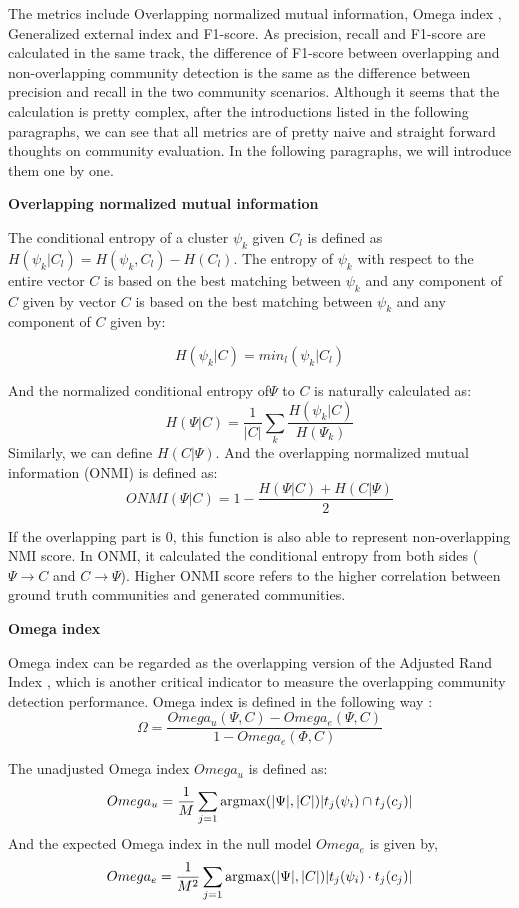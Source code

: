 The metrics include Overlapping normalized mutual information, Omega index ,  Generalized external index and F1-score. As precision, recall and F1-score  are calculated in the same track, the difference of F1-score between overlapping and non-overlapping community detection is the same as the difference between precision and recall in the two community scenarios. Although it seems that the calculation is pretty complex, after the introductions listed in the following paragraphs, we can see that all metrics are of pretty naive and straight forward thoughts on community evaluation. In the following paragraphs, we will introduce them one by one.

\textbf{Overlapping normalized   mutual information}

The conditional entropy of a cluster $\psi_{k}$ given $C_{l}$ is
defined as $H(\psi_{k}|C_{l}) = H(\psi_{k},C_{l}) - H(C_{l})$. The entropy of $\psi_{k}$ with respect to the entire vector $C$ is based on the best matching between $\psi_{k}$ and any component of $C$ given by
vector $C$ is based on the best matching between $\psi_{k}$ and any component of $C$ given by:

$$
H(\psi_{k}|C) = min_l (\psi_{k}|C_{l})
$$

And the normalized conditional entropy of$\Psi$ to $C$ is naturally calculated as:
$$
H(\Psi|C) = \frac{1}{|C|}\sum_{k} \frac{H(\psi_{k}|C)}{H(\Psi_{k}) }
$$
Similarly, we can define $H(C|\Psi)$. And the overlapping normalized mutual information (ONMI) \cite{mcdaid2011normalized} is defined as: 
$$ONMI(\Psi|C) = 1 - \frac{H(\Psi|C)+H(C|\Psi)}{2}$$

If the overlapping part is 0, this function is also able to represent non-overlapping NMI score. In ONMI, it calculated the conditional entropy from both sides ($\Psi \rightarrow	 C$ and $C \rightarrow	\Psi$). Higher ONMI score refers to the higher correlation between ground truth communities and generated communities.

\textbf{Omega index}

Omega index \cite{murray2012using} can be regarded as the overlapping version of the Adjusted Rand Index \cite{collins1988omega,murray2012using}, which is another critical indicator to measure the overlapping community detection performance. Omega index is defined in the following way \cite{gregory2011fuzzy,havemann2011identification}:
$$\Omega = \frac{Omega_{u}(\Psi,C)-Omega_{e}(\Psi,C)}{1-Omega_{e}(\Phi,C)}$$

The unadjusted Omega index $Omega_u$ is defined as:
$$Omega_u = \frac{1}{M}\sum_{j=1}\operatorname*{argmax} (|\Psi|,|C|)|t_{j}(\psi_{i})\cap t_{j}(c_{j})|$$
And the expected Omega index in the null model $Omega_e$
is given by,
$$Omega_e = \frac{1}{M^2}\sum_{j=1}\operatorname*{argmax} (|\Psi|,|C|)|t_{j}(\psi_{i})\cdot t_{j}(c_{j})|$$

